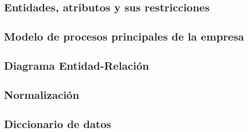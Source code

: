 \documentclass[../main.tex]{subfiles}
\begin{document}
\subsection{Entidades, atributos y sus restricciones}

\subsection{Modelo de procesos principales de la empresa}

\subsection{Diagrama Entidad-Relación}

\subsection{Normalización}

\subsection{Diccionario de datos}


\end{document}
